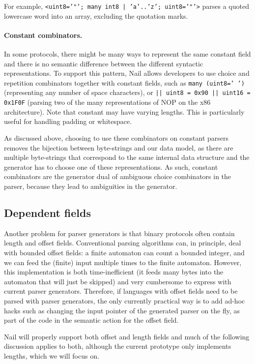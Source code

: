 For example, \texttt{<uint8='"'; many int8 | 'a'..'z'; uint8='"'>} parses a quoted
lowercase word into an array, excluding the quotation marks.

\paragraph{Constant combinators.}
In some protocols, there might be many ways to represent the same constant field
and there is no semantic difference between the different syntactic representations.
To support this pattern, Nail allows developers to use choice and repetition
combinators together with constant fields, such as
\texttt{many (uint8=' ')} (representing any number of space characters), or
\texttt{|| uint8 = 0x90 || uint16 = 0x1F0F} (parsing two of the many representations of NOP on the
x86 architecture). Note that constant may have varying lengths.
This is particularly useful for handling padding or whitespace.

As discussed above, choosing to use these combinators on constant parsers
removes the bijection between byte-strings and our data model, as there are
multiple byte-strings that correspond to the same internal data structure and
the generator has to choose one of these representations. As such, constant
combinators are the generator dual of ambiguous choice combinators in the
parser, because they lead to ambiguities in the generator.


\subsection{Dependent fields}
Another problem for parser generators is that binary protocols often contain
length and offset fields. Conventional parsing algorithms can, in principle,
deal with
bounded offset fields: a finite automaton can count a bounded integer, and we
can feed the (finite) input multiple times to the finite automaton. However,
this implementation is both time-inefficient (it feeds many bytes into the
automaton that will just be skipped) and very cumbersome to express with
current parser generators. Therefore, if languages with offset fields need
to be parsed
with parser generators, the only currently practical way is to add ad-hoc hacks
such as changing the input pointer of the generated parser on the fly, as part
of the code in the semantic action for the offset field.

Nail will properly support both offset and length fields and much of the
following discussion applies to both, although the current prototype only
implements lengths, which we will focus on.

